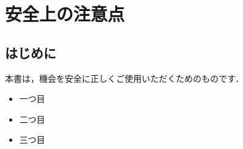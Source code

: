 %
%

\section*{安全上の注意点}
\subsection{はじめに}
本書は，機会を安全に正しくご使用いただくためのものです．
\vspace*{-1em}
\begin{itemize}
  \item 一つ目
  \item 二つ目
  \item 三つ目
\end{itemize}